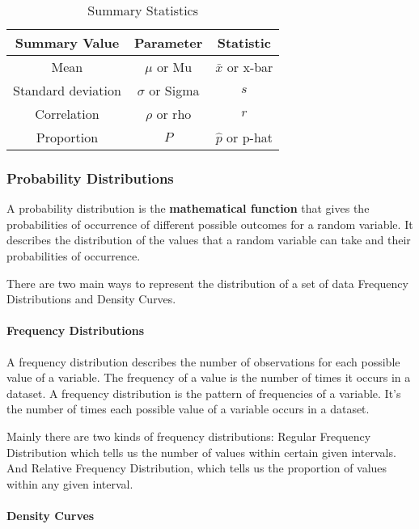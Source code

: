 \documentclass[11pt]{article}
\begin{document}
\begin{table}[h]
  \centering
  \begin{tabular}{|c|c|c|}
  \hline
  \textbf{Summary Value} & \textbf{Parameter} & \textbf{Statistic} \\ \hline
  Mean & $\mu$ or Mu & $\bar{x}$ or x-bar \\ \hline
  Standard deviation & $\sigma$ or Sigma & $s$ \\ \hline
  Correlation & $\rho$ or rho & $r$ \\ \hline
  Proportion & $P$ & $\hat{p}$ or p-hat \\ \hline
  \end{tabular}
  \caption{Summary Statistics}
  \label{tab:summary}
\end{table}
  

\hypertarget{probability-distributions}{%
\subsubsection{Probability Distributions}\label{probability-distributions}}

A probability distribution is the \textbf{mathematical function} that
gives the probabilities of occurrence of different possible outcomes for
a random variable. It describes the distribution of the values that a
random variable can take and their probabilities of occurrence.

There are two main ways to represent the distribution of a set of data
Frequency Distributions and Density Curves.

\hypertarget{frequency-distributions}{%
\paragraph{Frequency Distributions}\label{frequency-distributions}}

A frequency distribution describes the number of observations for
each possible value of a variable. The
frequency of a value is the number of times it occurs in a dataset. A
frequency distribution is the pattern of frequencies of a variable. It's
the number of times each possible value of a variable occurs in a
dataset.

Mainly there are two kinds of frequency distributions: Regular
Frequency Distribution which tells us the number of values within certain 
given
intervals. And Relative Frequency Distribution, which tells us the proportion of
values within any given interval.

\hypertarget{density-curves}{%
\paragraph{Density Curves}\label{density-curves}}
\end{document}
